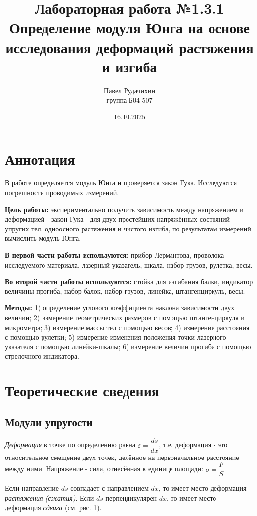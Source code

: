 \documentclass{article}
\title{Лабораторная работа №1.3.1 \\ Определение модуля Юнга на основе исследования деформаций растяжения и изгиба}
\author{Павел Рудачихин \\ группа Б04-507}
\date{16.10.2025}
\begin{document}
\maketitle

\section* {Аннотация} 

\hspace{4mm} В работе определяется модуль Юнга и проверяется закон Гука. Исследуются погрешности проводимых измерений.

\textbf{Цель работы:} экспериментально получить зависимость между напряжением и деформацией - закон Гука - для двух простейших напряжённых состояний упругих тел: одноосного растяжения и чистого изгиба; по результатам измерений вычислить модуль Юнга.

\textbf{В первой части работы используются:} прибор Лермантова, проволока исследуемого материала, лазерный указатель, шкала, набор грузов, рулетка, весы.

\textbf{Во второй части работы используются:} стойка для изгибания балки, индикатор величины прогиба, набор балок, набор грузов, линейка, штангенциркуль, весы.

\textbf{Методы:} 1) определение  углового  коэффициента  наклона  зависимости двух величин; 2) измерение геометрических размеров с помощью штангенциркуля и микрометра; 3) измерение массы тел с помощью весов; 4) измерение расстояния с помощью рулетки; 5) измерение изменения положения точки лазерного указателя с помощью линейки-шкалы; 6) измерение величин прогиба с помощью стрелочного индикатора. 


\section* {Теоретические сведения}
\subsection* {Модули упругости}

\hspace{4mm} \textit{Деформация} в точке по определению равна $\varepsilon = \dfrac{ds}{dx} $, т.е. деформация - это относительное смещение двух точек, делённое на первоначальное расстояние между ними. Напряжение - сила, отнесённая к единице площади: $\sigma = \dfrac{F}{S} $

Если направление $ds$ совпадает с направлением $dx$, то имеет место деформация \textit{растяжения (сжатия)}. Если $ds$ перпендикулярен $dx$, то имеет место деформация \textit{сдвига} (см. рис. 1).
\end{document}
